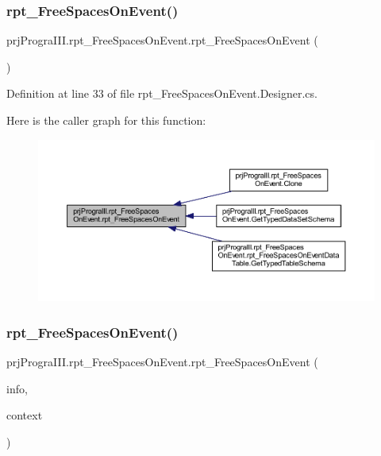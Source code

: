 \subsubsection{\texorpdfstring{rpt\+\_\+\+Free\+Spaces\+On\+Event()}{rpt\_FreeSpacesOnEvent()}\hspace{0.1cm}{\footnotesize\ttfamily [1/2]}}
{\footnotesize\ttfamily prj\+Progra\+I\+I\+I.\+rpt\+\_\+\+Free\+Spaces\+On\+Event.\+rpt\+\_\+\+Free\+Spaces\+On\+Event (\begin{DoxyParamCaption}{ }\end{DoxyParamCaption})}



Definition at line 33 of file rpt\+\_\+\+Free\+Spaces\+On\+Event.\+Designer.\+cs.

Here is the caller graph for this function\+:
\nopagebreak
\begin{figure}[H]
\begin{center}
\leavevmode
\includegraphics[width=350pt]{classprj_progra_i_i_i_1_1rpt___free_spaces_on_event_a2ed39f657ec0a43ec5d53560eece1a43_icgraph}
\end{center}
\end{figure}
\hypertarget{classprj_progra_i_i_i_1_1rpt___free_spaces_on_event_a7337e4fa1c372671526ead3b22854b28}{}\label{classprj_progra_i_i_i_1_1rpt___free_spaces_on_event_a7337e4fa1c372671526ead3b22854b28} 
\subsubsection{\texorpdfstring{rpt\+\_\+\+Free\+Spaces\+On\+Event()}{rpt\_FreeSpacesOnEvent()}\hspace{0.1cm}{\footnotesize\ttfamily [2/2]}}
{\footnotesize\ttfamily prj\+Progra\+I\+I\+I.\+rpt\+\_\+\+Free\+Spaces\+On\+Event.\+rpt\+\_\+\+Free\+Spaces\+On\+Event (\begin{DoxyParamCaption}\item[{global\+::\+System.\+Runtime.\+Serialization.\+Serialization\+Info}]{info,  }\item[{global\+::\+System.\+Runtime.\+Serialization.\+Streaming\+Context}]{context }\end{DoxyParamCaption})\hspace{0.3cm}{\ttfamily [protected]}}




